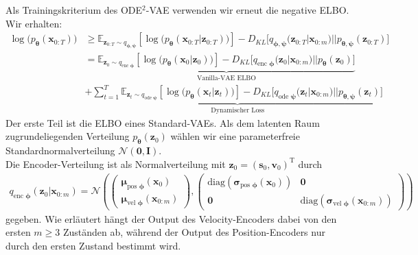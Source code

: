 \documentclass[12pt]{article}
\newcommand{\E}{\mathbb{E}}
\begin{document}
	Als Trainingskriterium des ODE$^2$-VAE verwenden wir erneut die negative ELBO.
	Wir erhalten:
	\begin{align*}
	\log\big(p_{\boldsymbol{\theta}}(\mathbf{x}_{0:T})\big)&\ge \E_{\mathbf{z}_{0:T}\sim q_{\boldsymbol\phi,\boldsymbol\psi}}
	\left[\log\big(p_{\boldsymbol\theta}\left(\mathbf{x}_{0:T}|\mathbf{z}_{0:T}\right)\big)\right] - D_{KL}\big[q_{\boldsymbol\phi,\boldsymbol\psi}(\mathbf{z}_{0:T}|\mathbf{x}_{0:m})||p_{\boldsymbol\theta,\boldsymbol\psi}(\mathbf{z}_{0:T})\big]\\
	&=\underbrace{\E_{\mathbf{z}_{0}\sim q_{\text{enc }\boldsymbol\phi}}
		\left[\log\big(p_{\boldsymbol\theta}\left(\mathbf{x}_{0}|\mathbf{z}_{0}\right)\big)\right] - D_{KL}\big[q_{\text{enc }\boldsymbol\phi}(\mathbf{z}_{0}|\mathbf{x}_{0:m})||p_{\boldsymbol\theta}(\mathbf{z}_{0})\big]}_{\text{Vanilla-VAE ELBO}}\\ &+ \underbrace{\sum_{t=1}^T \E_{\mathbf{z}_{t}\sim q_{\text{ode }\boldsymbol\psi}}
		\left[\log\big(p_{\boldsymbol\theta}\left(\mathbf{x}_{t}|\mathbf{z}_{t}\right)\big)\right] - D_{KL}\big[q_{\text{ode }\boldsymbol\psi}(\mathbf{z}_{t}|\mathbf{x}_{0:m})||p_{\boldsymbol\theta,\boldsymbol\psi}(\mathbf{z}_{t})\big]}_{\text{Dynamischer Loss}}
	\end{align*}
	Der erste Teil ist die ELBO eines Standard-VAEs.
	Als dem latenten Raum zugrundeliegenden Verteilung $p_{\boldsymbol\theta}(\mathbf{z}_{0})$ wählen wir eine parameterfreie Standardnormalverteilung $\mathcal{N}(\mathbf{0},\mathbf{I})$.\\
	Die Encoder-Verteilung ist als Normalverteilung mit $\mathbf{z}_{0} = (\mathbf{s}_{0},\mathbf{v}_{0})^{\mathrm{T}}$ durch
	\begin{align*}
	q_{\text{enc }\boldsymbol\phi}(\mathbf{z}_{0}|\mathbf{x}_{0:m}) =
	\mathcal{N}\left(\left(\begin{array}{cc}
	\boldsymbol\mu_{\text{pos }\boldsymbol\phi}(\textbf{x}_{0}) \\
	\boldsymbol\mu_{\text{vel }\boldsymbol\phi}(\textbf{x}_{0:m})
	\end{array}\right),\left(\begin{array}{cc}
	\text{diag}(\boldsymbol\sigma_{\text{pos }\boldsymbol\phi}(\textbf{x}_{0})) &
	\mathbf{0}\\
	\mathbf{0} &
	\text{diag}(\boldsymbol\sigma_{\text{vel }\boldsymbol\phi}(\textbf{x}_{0:m}))
	\end{array}\right)\right)
	\end{align*}
	gegeben. Wie erläutert hängt der Output des Velocity-Encoders dabei von den ersten $m\ge3$ Zuständen ab, während der Output des Position-Encoders nur durch den ersten Zustand bestimmt wird.\\
\end{document}
